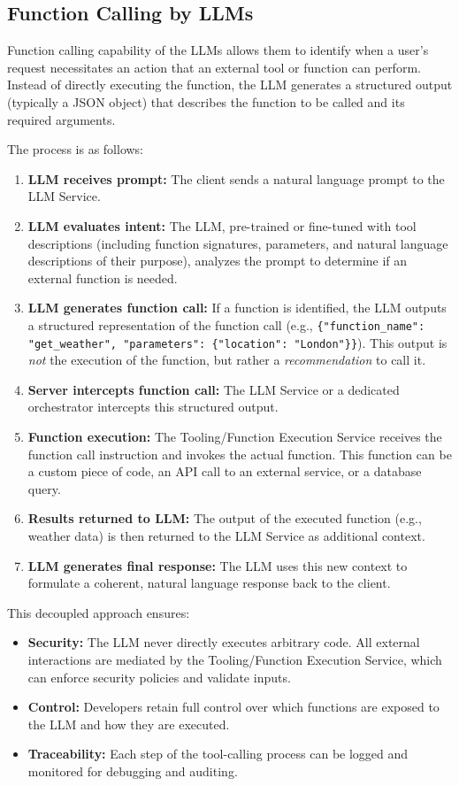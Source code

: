 \documentclass[10pt, a4paper]{article}
\begin{document}
\subsection{Function Calling by LLMs}
Function calling capability of the LLMs allows them to identify when a user's request necessitates an action that an external tool or function can perform. Instead of directly executing the function, the LLM generates a structured output (typically a JSON object) that describes the function to be called and its required arguments.

The process is as follows:
\begin{enumerate}
    \item \textbf{LLM receives prompt:} The client sends a natural language prompt to the LLM Service.
    \item \textbf{LLM evaluates intent:} The LLM, pre-trained or fine-tuned with tool descriptions (including function signatures, parameters, and natural language descriptions of their purpose), analyzes the prompt to determine if an external function is needed.
    \item \textbf{LLM generates function call:} If a function is identified, the LLM outputs a structured representation of the function call (e.g., \texttt{\{"function\_name": "get\_weather", "parameters": \{"location": "London"\}\}}). This output is \textit{not} the execution of the function, but rather a \textit{recommendation} to call it.
    \item \textbf{Server intercepts function call:} The LLM Service or a dedicated orchestrator intercepts this structured output.
    \item \textbf{Function execution:} The Tooling/Function Execution Service receives the function call instruction and invokes the actual function. This function can be a custom piece of code, an API call to an external service, or a database query.
    \item \textbf{Results returned to LLM:} The output of the executed function (e.g., weather data) is then returned to the LLM Service as additional context.
    \item \textbf{LLM generates final response:} The LLM uses this new context to formulate a coherent, natural language response back to the client.
\end{enumerate}
This decoupled approach ensures:
\begin{itemize}
    \item \textbf{Security:} The LLM never directly executes arbitrary code. All external interactions are mediated by the Tooling/Function Execution Service, which can enforce security policies and validate inputs.
    \item \textbf{Control:} Developers retain full control over which functions are exposed to the LLM and how they are executed.
    \item \textbf{Traceability:} Each step of the tool-calling process can be logged and monitored for debugging and auditing.
\end{itemize}
\end{document}
